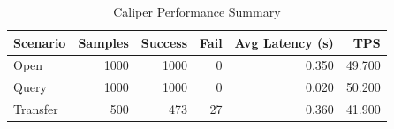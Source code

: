 \begin{table}
\caption{Caliper Performance Summary}
\label{tab:caliper_round}
\begin{tabular}{lrrrrr}
\toprule
Scenario & Samples & Success & Fail & Avg Latency (s) & TPS \\
\midrule
Open & 1000 & 1000 & 0 & 0.350 & 49.700 \\
Query & 1000 & 1000 & 0 & 0.020 & 50.200 \\
Transfer & 500 & 473 & 27 & 0.360 & 41.900 \\
\bottomrule
\end{tabular}
\end{table}
